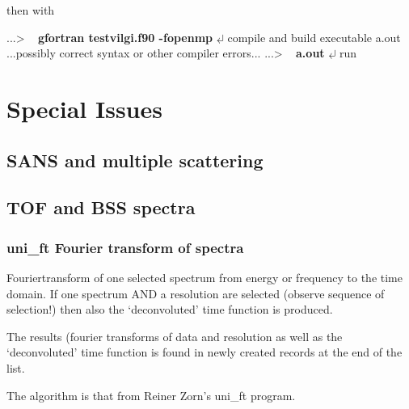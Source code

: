 \documentclass[11pt,fleqn]{book} %
\newcommand{\return}{$\carriagereturn$} %
\newcommand{\sysprompt}{{\color{green}...\textgreater} ~ }
\newcommand{\enter}[1]{{\color{red} \bf #1}}
\newcommand{\desc}[1]{\hskip 0.5cm {\color{descgray} #1}}
\newcommand{\expl}[1]{\hskip 0.5cm {\color{explgray} #1}}
\begin{document}
then with
\begin{corollary}
\sysprompt {\bf gfortran testvilgi.f90 -fopenmp} \return  \expl{compile and build executable a.out} \\
...possibly correct syntax or other compiler errors...
\sysprompt {\bf a.out} \return  \expl{run}
\end{corollary}


\part{Special Issues}

\chapter{SANS and multiple scattering}

\chapter{TOF and BSS spectra}

\section{uni\_ft \desc{Fourier transform of spectra}} 


\begin{exercise}
Fouriertransform of one selected spectrum from energy or frequency to the time domain. 
If one spectrum AND a resolution are
selected (observe sequence of selection!) then also the `deconvoluted'
time function is produced.
\end{exercise}


The results (fourier transforms of data and resolution as well as the
`deconvoluted' time function is found in newly created records at the
end of the list.

The algorithm is that from Reiner Zorn's uni\_ft program.
\end{document}
